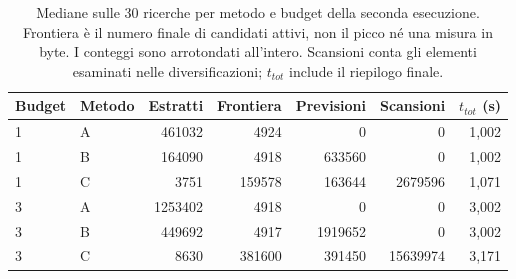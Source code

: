 \begin{table}[!htbp]
\centering\small
\caption{Mediane sulle 30 ricerche per metodo e budget della seconda esecuzione. Frontiera è il numero finale di candidati attivi, non il picco né una misura in byte. I conteggi sono arrotondati all'intero. Scansioni conta gli elementi esaminati nelle diversificazioni; $t_{tot}$ include il riepilogo finale.}\label{tab:work}
\begin{tabular}{llrrrrr}
\toprule
Budget & Metodo & Estratti & Frontiera & Previsioni & Scansioni & $t_{tot}$ (s)\\
\midrule
1 & A & 461032 & 4924 & 0 & 0 & 1{,}002\\
1 & B & 164090 & 4918 & 633560 & 0 & 1{,}002\\
1 & C & 3751 & 159578 & 163644 & 2679596 & 1{,}071\\
3 & A & 1253402 & 4918 & 0 & 0 & 3{,}002\\
3 & B & 449692 & 4917 & 1919652 & 0 & 3{,}002\\
3 & C & 8630 & 381600 & 391450 & 15639974 & 3{,}171\\
\bottomrule
\end{tabular}
\end{table}
